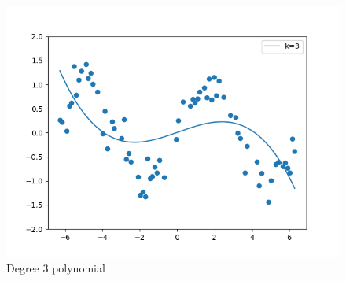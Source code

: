 \begin{answer}
    \begin{figure}[H]
        \includegraphics[width=\textwidth]{../src/featuremaps/deg3.png}
        \caption{Degree 3 polynomial}
    \end{figure}
\end{answer}
